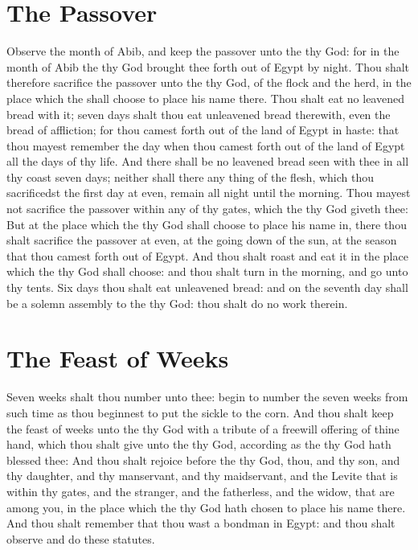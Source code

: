 \section*{The Passover}
\begin{biblechapter} %
\verse Observe the month of Abib, and keep the passover unto the \LORD thy God: for in the month of Abib the \LORD thy God brought thee forth out of Egypt by night.
\verse Thou shalt therefore sacrifice the passover unto the \LORD thy God, of the flock and the herd, in the place which the \LORD shall choose to place his name there.
\verse Thou shalt eat no leavened bread with it; seven days shalt thou eat unleavened bread therewith, even the bread of affliction; for thou camest forth out of the land of Egypt in haste: that thou mayest remember the day when thou camest forth out of the land of Egypt all the days of thy life.
\verse And there shall be no leavened bread seen with thee in all thy coast seven days; neither shall there any thing of the flesh, which thou sacrificedst the first day at even, remain all night until the morning.
\verse Thou mayest not sacrifice the passover within any of thy gates, which the \LORD thy God giveth thee:
\verse But at the place which the \LORD thy God shall choose to place his name in, there thou shalt sacrifice the passover at even, at the going down of the sun, at the season that thou camest forth out of Egypt.
\verse And thou shalt roast and eat it in the place which the \LORD thy God shall choose: and thou shalt turn in the morning, and go unto thy tents.
\verse Six days thou shalt eat unleavened bread: and on the seventh day shall be a solemn assembly to the \LORD thy God: thou shalt do no work therein.
\section*{The Feast of Weeks}
\verse Seven weeks shalt thou number unto thee: begin to number the seven weeks from such time as thou beginnest to put the sickle to the corn.
\verse And thou shalt keep the feast of weeks unto the \LORD thy God with a tribute of a freewill offering of thine hand, which thou shalt give unto the \LORD thy God, according as the \LORD thy God hath blessed thee:
\verse And thou shalt rejoice before the \LORD thy God, thou, and thy son, and thy daughter, and thy manservant, and thy maidservant, and the Levite that is within thy gates, and the stranger, and the fatherless, and the widow, that are among you, in the place which the \LORD thy God hath chosen to place his name there.
\verse And thou shalt remember that thou wast a bondman in Egypt: and thou shalt observe and do these statutes.

\end{biblechapter}
